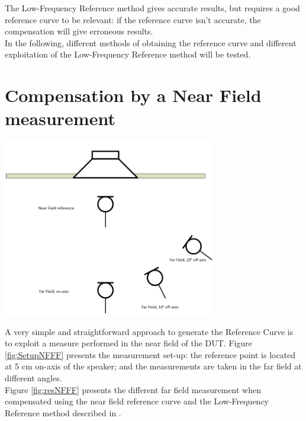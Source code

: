 \documentclass{report}
\begin{document}
\vspace{0.2cm}

The Low-Frequency Reference method gives accurate results, but requires a good reference curve to be relevant: if the reference curve isn't accurate, the compensation will give erroneous results. \\
In the following, different methods of obtaining the reference curve and different exploitation of the Low-Frequency Reference method will be tested. 

\section{Compensation by a Near Field measurement}

\begin{minipage}{0.4\textwidth}
\begin{center}
	\includegraphics[width=0.7\textwidth]{RoomComp/NFFF_Setup} 
    \captionsetup{hypcap=false} 
	\label{fig:SetupNFFF}
\end{center}
\end{minipage}
\begin{minipage}{0.6\textwidth}
A very simple and straightforward approach to generate the Reference Curve is to exploit a measure performed in the near field of the DUT. Figure \ref{fig:SetupNFFF} presents the measurement set-up: the reference point is located at 5 cm on-axis of the speaker; and the measurements are taken in the far field at different angles. \\

Figure \ref{fig:resNFFF} presents the different far field measurement when compensated using the near field reference curve and the Low-Frequency Reference method described in \citep[][sect.~4]{aeswb}. 
\end{minipage}
\end{document}

